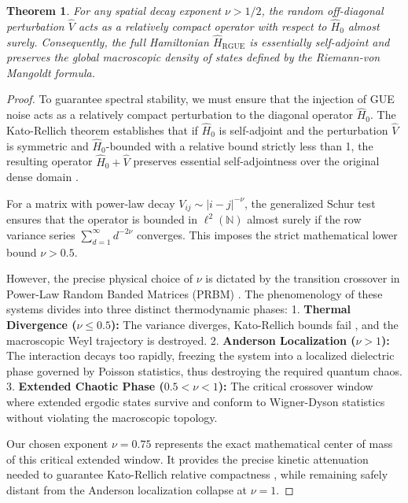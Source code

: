 \documentclass[prl,aps,floatfix,superscriptaddress,10pt]{revtex4-2}
\newtheorem{theorem}{Theorem}[section]
\begin{document}
\begin{theorem}
For any spatial decay exponent $\nu > 1/2$, the random off-diagonal perturbation $\hat{V}$ acts as a relatively compact operator with respect to $\hat{H}_0$ almost surely.
Consequently, the full Hamiltonian $\hat{H}_{\text{RGUE}}$ is essentially self-adjoint and preserves the global macroscopic density of states defined by the Riemann-von Mangoldt formula.
\end{theorem}

\begin{proof}
To guarantee spectral stability, we must ensure that the injection of GUE noise acts as a relatively compact perturbation to the diagonal operator $\hat{H}_0$. The Kato-Rellich theorem establishes that if $\hat{H}_0$ is self-adjoint and the perturbation $\hat{V}$ is symmetric and $\hat{H}_0$-bounded with a relative bound strictly less than 1, the resulting operator $\hat{H}_0 + \hat{V}$ preserves essential self-adjointness over the original dense domain \cite{ReedSimon1975}.

For a matrix with power-law decay $V_{ij} \sim |i-j|^{-\nu}$, the generalized Schur test ensures that the operator is bounded in $\ell^2(\mathbb{N})$ almost surely if the row variance series $\sum_{d=1}^\infty d^{-2\nu}$ converges. This imposes the strict mathematical lower bound $\nu > 0.5$.

However, the precise physical choice of $\nu$ is dictated by the transition crossover in Power-Law Random Banded Matrices (PRBM) \cite{Mirlin1996}. The phenomenology of these systems divides into three distinct thermodynamic phases:
1. \textbf{Thermal Divergence ($\nu \le 0.5$):} The variance diverges, Kato-Rellich bounds fail \cite{ReedSimon1975}, and the macroscopic Weyl trajectory is destroyed.
2. \textbf{Anderson Localization ($\nu > 1$):} The interaction decays too rapidly, freezing the system into a localized dielectric phase governed by Poisson statistics, thus destroying the required quantum chaos.
3. \textbf{Extended Chaotic Phase ($0.5 < \nu < 1$):} The critical crossover window where extended ergodic states survive and conform to Wigner-Dyson statistics without violating the macroscopic topology.

Our chosen exponent $\nu = 0.75$ represents the exact mathematical center of mass of this critical extended window. It provides the precise kinetic attenuation needed to guarantee Kato-Rellich relative compactness \cite{ReedSimon1975}, while remaining safely distant from the Anderson localization collapse at $\nu=1$.
\end{proof}
\end{document}
